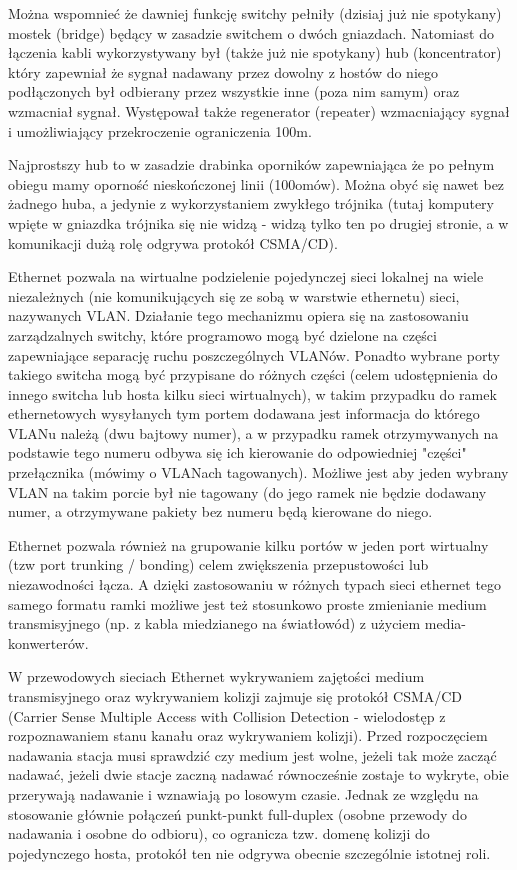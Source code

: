 \documentclass{pdfBooklets}
\begin{document}
\begin{teacherOnly}
Można wspomnieć że dawniej funkcję switchy pełniły (dzisiaj już nie spotykany) mostek (bridge) będący w zasadzie switchem o dwóch gniazdach.
Natomiast do łączenia kabli wykorzystywany był (także już nie spotykany) hub (koncentrator) który zapewniał że sygnał nadawany przez dowolny z hostów do niego podłączonych był odbierany przez wszystkie inne (poza nim samym) oraz wzmacniał sygnał. Występował także regenerator (repeater) wzmacniający sygnał i umożliwiający przekroczenie ograniczenia 100m.

Najprostszy hub to w zasadzie drabinka oporników zapewniająca że po pełnym obiegu mamy oporność nieskończonej linii (100omów).
Można obyć się nawet bez żadnego huba, a jedynie z wykorzystaniem zwykłego trójnika (tutaj komputery wpięte w gniazdka trójnika się nie widzą - widzą tylko ten po drugiej stronie, a w komunikacji dużą rolę odgrywa protokół CSMA/CD).
\end{teacherOnly}

Ethernet pozwala na wirtualne podzielenie pojedynczej sieci lokalnej na wiele niezależnych (nie komunikujących się ze sobą w warstwie ethernetu) sieci, nazywanych VLAN. Działanie tego mechanizmu opiera się na zastosowaniu zarządzalnych switchy, które programowo mogą być dzielone na części zapewniające separację ruchu poszczególnych VLANów. Ponadto wybrane porty takiego switcha mogą być przypisane do różnych części (celem udostępnienia do innego switcha lub hosta kilku sieci wirtualnych), w takim przypadku do ramek ethernetowych wysyłanych tym portem dodawana jest informacja do którego VLANu należą (dwu bajtowy numer), a w przypadku ramek otrzymywanych na podstawie tego numeru odbywa się ich kierowanie do odpowiedniej "części" przełącznika (mówimy o VLANach tagowanych). Możliwe jest aby jeden wybrany VLAN na takim porcie był nie tagowany (do jego ramek nie będzie dodawany numer, a otrzymywane pakiety bez numeru będą kierowane do niego.

Ethernet pozwala również na grupowanie kilku portów w jeden port wirtualny (tzw port trunking / bonding) celem zwiększenia przepustowości lub niezawodności łącza. A dzięki zastosowaniu w różnych typach sieci ethernet tego samego formatu ramki możliwe jest też stosunkowo proste zmienianie medium transmisyjnego (np. z kabla miedzianego na światłowód) z użyciem media-konwerterów.

W przewodowych sieciach Ethernet wykrywaniem zajętości medium transmisyjnego oraz wykrywaniem kolizji zajmuje się protokół CSMA/CD (Carrier Sense Multiple Access with Collision Detection - wielodostęp z rozpoznawaniem stanu kanału oraz wykrywaniem kolizji). Przed rozpoczęciem nadawania stacja musi sprawdzić czy medium jest wolne, jeżeli tak może zacząć nadawać, jeżeli dwie stacje zaczną nadawać równocześnie zostaje to wykryte, obie przerywają nadawanie i wznawiają po losowym czasie. Jednak ze względu na stosowanie głównie połączeń punkt-punkt full-duplex (osobne przewody do nadawania i osobne do odbioru), co ogranicza tzw. domenę kolizji do pojedynczego hosta, protokół ten nie odgrywa obecnie szczególnie istotnej roli.
\end{document}
